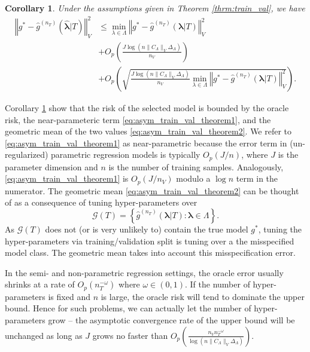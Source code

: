 \documentclass[12pt]{article} %
\newtheorem{corollary}{Corollary}
\theoremstyle{definition}
\begin{document}
\begin{corollary}
	\label{corr:train_val}
	Under the assumptions given in Theorem \ref{thrm:train_val}, we have
	\begin{align}
	\left\Vert g^* - \hat{g}^{(n_T)}( \hat{\boldsymbol{\lambda}} | T) \right\Vert _{V}^2 &
	\le \min_{\lambda \in \Lambda} \left\Vert g^* - \hat{g}^{(n_T)}( {\boldsymbol{\lambda}} | T) \right \Vert^2_{V}
	\label{eq:asym_train_val_oracle_risk}
	\\
	& + O_p \left(\frac{J\log (n \|C_\Lambda\|_V \Delta_{\Lambda} )}{n_{V}} \right) 
	\label{eq:asym_train_val_theorem1} \\
	& + O_p \left(
	\sqrt{
		\frac{J \log (n \|C_\Lambda\|_V \Delta_{\Lambda} )}{n_{V}}
		\min_{\lambda \in \Lambda} \left\Vert g^* - \hat{g}^{(n_T)}( {\boldsymbol{\lambda}} | T) \right \Vert^2_{V}
	}
	\right ).
	\label{eq:asym_train_val_theorem2}
	\end{align}
\end{corollary}
\noindent
Corollary \ref{corr:train_val} show that the risk of the selected model is bounded by the oracle risk, the near-parameteric term \eqref{eq:asym_train_val_theorem1}, and the geometric mean of the two values \eqref{eq:asym_train_val_theorem2}.
We refer to \eqref{eq:asym_train_val_theorem1} as near-parametric because the error term in (un-regularized) parametric regression models is typically $O_p(J/n)$, where $J$ is the parameter dimension and $n$ is the number of training samples. Analogously, \eqref{eq:asym_train_val_theorem1} is $O_p(J/n_V)$ modulo a $\log n$ term in the numerator.
The geometric mean \eqref{eq:asym_train_val_theorem2} can be thought of as a consequence of tuning hyper-parameters over
\begin{equation}
\mathcal{G}(T) = \left \{ \hat{g}^{(n_T)}( {\boldsymbol{\lambda}}| T) : \boldsymbol{\lambda} \in \Lambda \right \}.
\end{equation}
As $\mathcal{G}(T)$ does not (or is very unlikely to) contain the true model $g^*$, tuning the hyper-parameters via training/validation split is tuning over a the misspecified model class.
The geometric mean takes into account this misspecification error.

In the semi- and non-parametric regression settings, the oracle error usually shrinks at a rate of $O_p(n_T^{-\omega})$ where $\omega \in (0, 1)$.
If the number of hyper-parameters is fixed and $n$ is large, the oracle risk will tend to dominate the upper bound.
Hence for such problems, we can actually let the number of hyper-parameters grow -- the asymptotic convergence rate of the upper bound will be unchanged as long as $J$ grows no faster than
$
O_p\left (
\frac{n_{V} n_T^{-\omega}}{\log (n \|C_\Lambda\|_V \Delta_{\Lambda})}
\right ).
$
\end{document}

